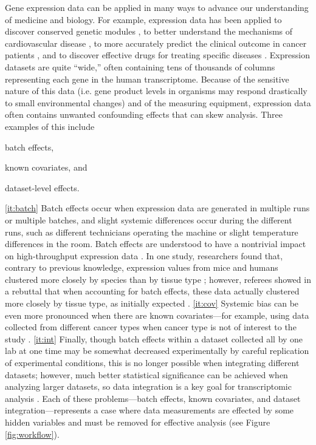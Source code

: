 \documentclass[notitlepage]{article}
\begin{document}
Gene expression data can be applied in many ways to advance our understanding of medicine and biology.
For example, expression data has been applied to discover conserved genetic modules \citep{stuart_gene-coexpression_2003}, to better understand the mechanisms of cardiovascular disease \citep{henriksen_application_2002}, to more accurately predict the clinical outcome in cancer patients \citep{veer_gene_2002}, and to discover effective drugs for treating specific diseases \citep{sirota_discovery_2011}.
Expression datasets are quite ``wide,'' often containing tens of thousands of columns representing each gene in the human transcriptome.
Because of the sensitive nature of this data (i.e. gene product levels in organisms may respond drastically to small environmental changes) and of the measuring equipment, expression data often contains unwanted confounding effects that can skew analysis.
Three examples of this include
\begin{enumerate*}[(a)]
	\item batch effects, \label{it:batch}
	\item known covariates, and \label{it:cov}
	\item dataset-level effects. \label{it:int}
\end{enumerate*}
\ref{it:batch} Batch effects occur when expression data are generated in multiple runs or multiple batches, and slight systemic differences occur during the different runs, such as different technicians operating the machine or slight temperature differences in the room.
Batch effects are understood to have a nontrivial impact on high-throughput expression data \citep{leek_tackling_2010}.
In one study, researchers found that, contrary to previous knowledge, expression values from mice and humans clustered more closely by species than by tissue type \citep{yue_comparative_2014};
however, referees showed in a rebuttal that when accounting for batch effects, these data actually clustered more closely by tissue type, as initially expected \citep{gilad_reanalysis_2015}.
\ref{it:cov} Systemic bias can be even more pronounced when there are known covariates---for example, using data collected from different cancer types when cancer type is not of interest to the study \citep{dayton_classifying_2017-1}.
\ref{it:int} Finally, though batch effects within a dataset collected all by one lab at one time may be somewhat decreased experimentally by careful replication of experimental conditions, this is no longer possible when integrating different datasets;
however, much better statistical significance can be achieved when analyzing larger datasets, so data integration is a key goal for transcriptomic analysis  \citep{lazar_batch_2013}.
Each of these problems---batch effects, known covariates, and dataset integration---represents a case where data measurements are effected by some hidden variables and must be removed for effective analysis (see Figure \ref{fig:workflow}).
\end{document}
